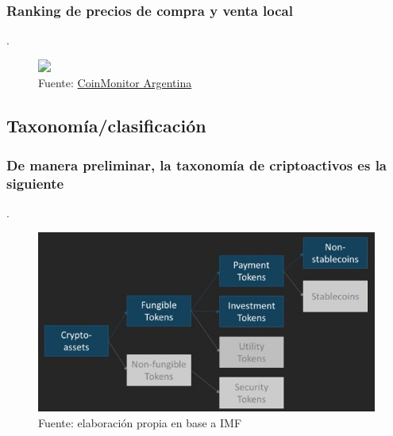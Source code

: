 \begin{frame}
\frametitle{Ranking de precios de compra y venta local}.

    \begin{figure}
    \centering
        \includegraphics<1>[width=1\textwidth]{images/C1/arg/coinmonitor.jpg}
        \caption*{Fuente: \href{https://www.coinmonitor.info/}{CoinMonitor Argentina}}
        \end{figure}
        

\end{frame}

\subsection{Taxonomía/clasificación}

\begin{frame}
\frametitle{De manera preliminar, la taxonomía de criptoactivos es la siguiente}.

    \begin{figure}
    \centering
        \includegraphics[width=1\textwidth]{images/C1/classification/classification.jpg}
        \caption*{Fuente: elaboración propia en base a IMF}
        \end{figure}
        
    \note{
    \begin{itemize}
        \item 
    \end{itemize}
    }

\end{frame}

